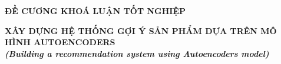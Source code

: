\documentclass{article}[14pt]
\begin{document}
    \begin{figure}[h]
        \begin{floatrow}
        {%
    
        }
        {%
    
        }
        \end{floatrow}
    \end{figure}
    
    \begin{center}
        
        \textbf{\Large ĐỀ CƯƠNG KHOÁ LUẬN TỐT NGHIỆP} \\ 
    \end{center}
    
    
    \begin{center}
        
        \textbf{\huge  XÂY DỰNG HỆ THỐNG GỢI Ý SẢN PHẨM DỰA TRÊN MÔ HÌNH AUTOENCODERS} \\
        
    \vspace{.5cm}
        \textit{\textbf{\Large (Building a recommendation system using Autoencoders model)}}
    \end{center}
    
\end{document}
